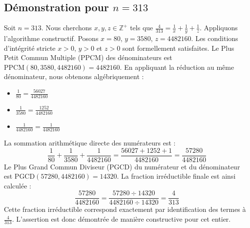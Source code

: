 \documentclass[11pt,a4paper]{article}
\begin{document}
\subsection{Démonstration pour $n = 313$}
Soit $n = 313$. Nous cherchons $x, y, z \in \mathbb{Z}^{+}$ tels que $\frac{4}{313} = \frac{1}{x} + \frac{1}{y} + \frac{1}{z}$.
Appliquons l'algorithme constructif. Posons $x = 80$, $y = 3580$, $z = 4482160$.
Les conditions d'intégrité stricte $x > 0$, $y > 0$ et $z > 0$ sont formellement satisfaites.
Le Plus Petit Commun Multiple (PPCM) des dénominateurs est $\text{PPCM}(80, 3580, 4482160) = 4482160$.
En appliquant la réduction au même dénominateur, nous obtenons algébriquement :
\begin{itemize}
    \item $\frac{1}{80} = \frac{56027}{4482160}$
    \item $\frac{1}{3580} = \frac{1252}{4482160}$
    \item $\frac{1}{4482160} = \frac{1}{4482160}$
\end{itemize}
La sommation arithmétique directe des numérateurs est :
$$ \frac{1}{80} + \frac{1}{3580} + \frac{1}{4482160} = \frac{56027 + 1252 + 1}{4482160} = \frac{57280}{4482160} $$
Le Plus Grand Commun Diviseur (PGCD) du numérateur et du dénominateur est $\text{PGCD}(57280, 4482160) = 14320$.
La fraction irréductible finale est ainsi calculée :
$$ \frac{57280}{4482160} = \frac{57280 \div 14320}{4482160 \div 14320} = \frac{4}{313} $$
Cette fraction irréductible correspond exactement par identification des termes à $\frac{4}{313}$. L'assertion est donc démontrée de manière constructive pour cet entier.
\end{document}
